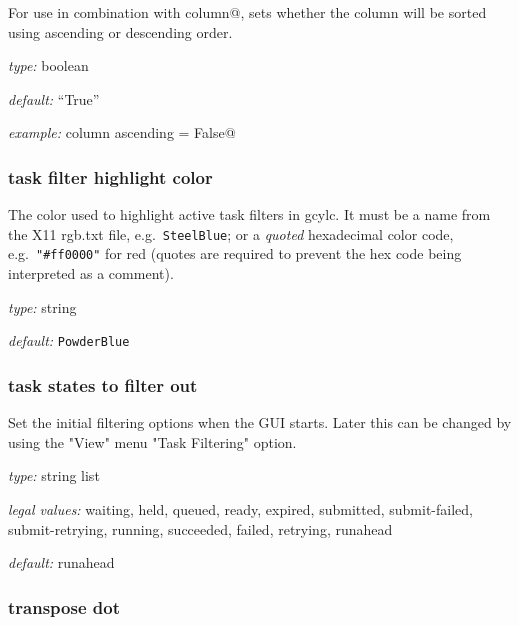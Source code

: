For use in combination with \lstinline@sort column@, sets whether the column will
be sorted using ascending or descending order.

\begin{myitemize}
    \item {\em type:} boolean
    \item {\em default:} ``True''
    \item {\em example:} \lstinline@sort column ascending = False@
\end{myitemize}


\subsubsection{task filter highlight color}

The color used to highlight active task filters in gcylc. It must be a name
from the X11 rgb.txt file, e.g.\ \lstinline=SteelBlue=; or a
{\em quoted} hexadecimal color code, e.g.\ \lstinline="#ff0000"= for red (quotes
are required to prevent the hex code being interpreted as a comment).

\begin{myitemize}
    \item {\em type:} string
    \item {\em default:} \lstinline=PowderBlue=
\end{myitemize}


\subsubsection{task states to filter out}

Set the initial filtering options when the GUI starts. Later this can be
changed by using the "View" menu "Task Filtering" option.

\begin{myitemize}
\item {\em type:} string list
\item {\em legal values:} waiting, held, queued, ready, expired, submitted,
submit-failed, submit-retrying, running, succeeded, failed, retrying, runahead
\item {\em default:} runahead
\end{myitemize}


\subsubsection{transpose dot}

